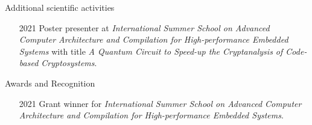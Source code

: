 \documentclass[
	a4paper, %
	10pt, %
]{tresume} %
\begin{document}
\begin{tSection}{Additional scientific activities}
  \begin{itemize}
  \item[2021] Poster presenter at \emph{International Summer School on Advanced
      Computer Architecture and Compilation for High-performance Embedded
      Systems} with title \emph{A Quantum Circuit to Speed-up the Cryptanalysis
      of Code-based Cryptosystems}.
  \end{itemize}
\end{tSection}
\begin{tSection}{Awards and Recognition}
  \begin{itemize}
  \item[2021] Grant winner for \emph{International Summer School on Advanced
      Computer Architecture and Compilation for High-performance Embedded
      Systems}.
  \end{itemize}
\end{tSection}
\vfill
\ifpublic{%
    \ifgdpr{%
    
    
  }
  \fi
}
\fi
\end{document}
